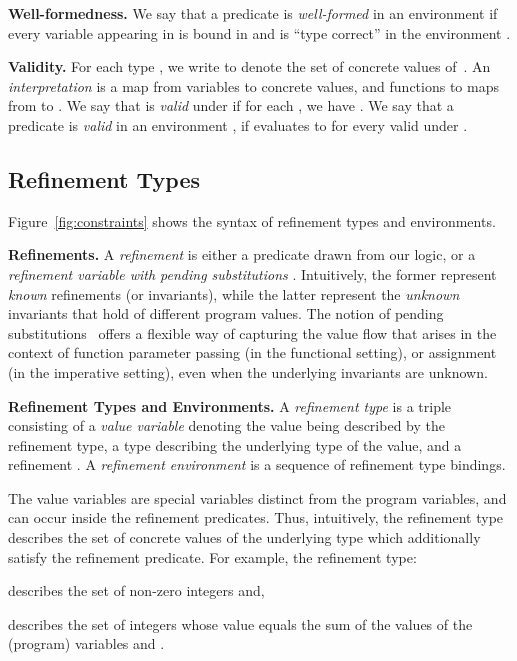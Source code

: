 \documentclass[nocopyrightspace]{sigplanconf}
\def\mypara#1{\smallskip\noindent\textbf{#1}}
\begin{document}
\mypara{Well-formedness.}
We say that a predicate  is \emph{well-formed} in an environment
 if every variable appearing in  is bound in  and
 is ``type correct'' in the environment .

\mypara{Validity.}
For each type , we write  to denote the set of
concrete values of~.
An \emph{interpretation}  is a map from 
variables  to concrete values, and 
functions  to maps from  to .
We say that  is \emph{valid} under  if 
for each , we have .
We say that a predicate  is \emph{valid} in an environment , 
if  evaluates to  for 
every  valid under . 

\subsection{Refinement Types}
\label{sec:reftypes}

Figure~\ref{fig:constraints} shows the syntax of refinement types and 
environments. 

\mypara{Refinements.}
A \emph{refinement}  is either a predicate  drawn from our logic,
or a \emph{refinement variable with pending substitutions}
. 
Intuitively, the former represent \emph{known} refinements (or invariants), 
while the latter represent the \emph{unknown} invariants that hold 
of different program values. 
The notion of pending substitutions~\cite{AbadiCardelliCurienLevy,Knowles07} offers a
flexible way of capturing the value flow that arises in the context of
function parameter passing (in the functional setting), or assignment 
(in the imperative setting), even when the underlying 
invariants are unknown.



\mypara{Refinement Types and Environments.}
A \emph{refinement type}  is a triple
consisting of a \emph{value variable}  denoting the value being
described by the refinement type, a type  describing the
underlying type of the value, and a refinement . 
A \emph{refinement environment}  is a sequence of refinement type
bindings.

The value variables are special variables distinct from the program
variables, and can occur inside the refinement predicates.
Thus, intuitively, the refinement type describes the set of
concrete values of the underlying type  which additionally 
satisfy the refinement predicate. For example, the refinement type:
	
describes the set of non-zero integers and,
	
describes the set of integers whose value equals 
the sum of the values of the (program) variables  and .
\end{document}
